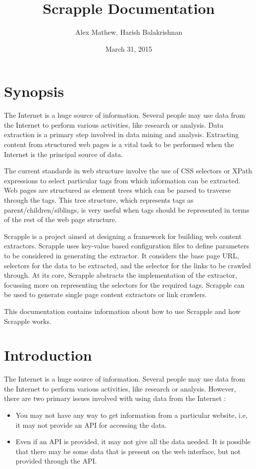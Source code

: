 \documentclass[letterpaper,12pt,english]{sphinxmanual}
\title{Scrapple Documentation}
\date{March 31, 2015}
\author{Alex Mathew, Harish Balakrishnan}
\begin{document}
\maketitle
\tableofcontents
{}\label{index::doc}



\chapter{Synopsis}
\label{index:scrapple-version-documentation}\label{index:synopsis}
The Internet is a huge source of information. Several people may use data from the Internet to perform various activities, like research or analysis. Data extraction is a primary step involved in data mining and analysis. Extracting content from structured web pages is a vital task to be performed when the Internet is the principal source of data.

The current standards in web structure involve the use of CSS selectors or XPath expressions to select particular tags from which information can be extracted. Web pages are structured as element trees which can be parsed to traverse through the tags. This tree structure, which represents tags as parent/children/siblings, is very useful when tags should be represented in terms of the rest of the web page structure.

Scrapple is a project aimed at designing a framework for building web content extractors. Scrapple uses key-value based configuration files to define parameters to be considered in generating the extractor. It considers the base page URL, selectors for the data to be extracted, and the selector for the links to be crawled through. At its core, Scrapple abstracts the implementation of the extractor, focussing more on representing the selectors for the required tags. Scrapple can be used to generate single page content extractors or link crawlers.

This documentation contains information about how to use Scrapple and how Scrapple works.


\chapter{Introduction}
\label{index:introduction}
The Internet is a huge source of information. Several people may use data from the Internet to perform various activities, like research or analysis. However, there are two primary issues involved with using data from the Internet :
\begin{itemize}
\item {} 
You may not have any way to get information from a particular website, i.e, it may not provide an API for accessing the data.

\item {} 
Even if an API is provided, it may not give all the data needed. It is possible that there may be some data that is present on the web interface, but not provided through the API.

\end{itemize}
\end{document}
